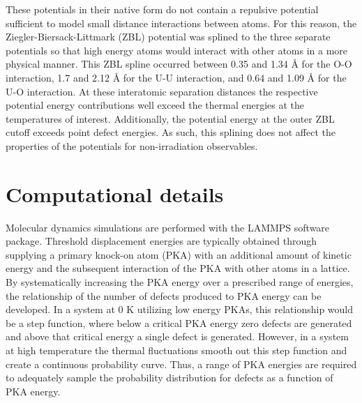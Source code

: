 \documentclass[review]{elsarticle}
\begin{document}
These potentials in their native form do not contain a repulsive potential sufficient to model small distance interactions between atoms. For this reason, the Ziegler-Biersack-Littmark (ZBL) \cite{ZBL} potential was splined to the three separate potentials so that high energy atoms would interact with other atoms in a more physical manner. This ZBL spline occurred between 0.35 and 1.34 {\AA} for the O-O interaction, 1.7 and 2.12 {\AA} for the U-U interaction, and 0.64 and 1.09 {\AA} for the U-O interaction. At these interatomic separation distances the respective potential energy contributions well exceed the thermal energies at the temperatures of interest. Additionally, the potential energy at the outer ZBL cutoff exceeds point defect energies. As such, this splining does not affect the properties of the potentials for non-irradiation observables.

\section{Computational details}

\hspace{5mm}

Molecular dynamics simulations are performed with the LAMMPS \cite{lammps} software package. Threshold displacement energies are typically obtained through supplying a primary knock-on atom (PKA) with an additional amount of kinetic energy and the subsequent interaction of the PKA with other atoms in a lattice. By systematically increasing the PKA energy over a prescribed range of energies, the relationship of the number of defects produced to PKA energy can be developed. In a system at 0 K utilizing low energy PKAs, this relationship would be a step function, where below a critical PKA energy zero defects are generated and above that critical energy a single defect is generated. However, in a system at high temperature the thermal fluctuations smooth out this step function and create a continuous probability curve. Thus, a range of PKA energies are required to adequately sample the probability distribution for defects as a function of PKA energy.
\end{document}
